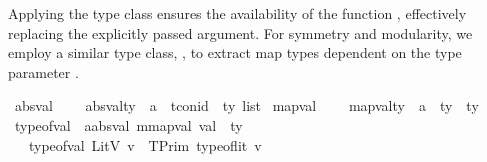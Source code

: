 Applying the type class  ensures the availability of the function ,
effectively replacing the explicitly passed argument.
For symmetry and modularity, we employ a similar type class, ,
to extract map types dependent on the type parameter .




\begin{isabellebody}\isanewline
{}\isamarkupfalse%
\ absval\ {\isacharequal}{\kern0pt}\isanewline
\ \ \ absval{\isacharunderscore}{\kern0pt}ty\ {\isacharcolon}{\kern0pt}{\isacharcolon}{\kern0pt}\ {\isachardoublequoteopen}{\isacharprime}{\kern0pt}a\ {\isasymRightarrow}\ {\isacharparenleft}{\kern0pt}tcon{\isacharunderscore}{\kern0pt}id\ {\isasymtimes}\ ty\ list{\isacharparenright}{\kern0pt}{\isachardoublequoteclose}\isanewline
\isanewline
{}\isamarkupfalse%
\ mapval\ {\isacharequal}{\kern0pt}\isanewline
\ \ \ mapval{\isacharunderscore}{\kern0pt}ty\ {\isacharcolon}{\kern0pt}{\isacharcolon}{\kern0pt}\ {\isachardoublequoteopen}{\isacharprime}{\kern0pt}a\ {\isasymRightarrow}\ {\isacharparenleft}{\kern0pt}ty\ {\isasymtimes}\ ty{\isacharparenright}{\kern0pt}{\isachardoublequoteclose}\isanewline
\isanewline
{}\isamarkupfalse%
\ type{\isacharunderscore}{\kern0pt}of{\isacharunderscore}{\kern0pt}val\ {\isacharcolon}{\kern0pt}{\isacharcolon}{\kern0pt}\ {\isachardoublequoteopen}{\isacharparenleft}{\kern0pt}{\isacharprime}{\kern0pt}a{\isacharcolon}{\kern0pt}{\isacharcolon}{\kern0pt}absval{\isacharcomma}{\kern0pt}\ {\isacharprime}{\kern0pt}m{\isacharcolon}{\kern0pt}{\isacharcolon}{\kern0pt}mapval{\isacharparenright}{\kern0pt}\ val\ {\isasymRightarrow}\ ty{\isachardoublequoteclose}\isanewline
\ \ \isanewline
\ \ \ {\isachardoublequoteopen}type{\isacharunderscore}{\kern0pt}of{\isacharunderscore}{\kern0pt}val\ {\isacharparenleft}{\kern0pt}LitV\ v{\isacharparenright}{\kern0pt}\ {\isacharequal}{\kern0pt}\ TPrim\ {\isacharparenleft}{\kern0pt}type{\isacharunderscore}{\kern0pt}of{\isacharunderscore}{\kern0pt}lit\ v{\isacharparenright}{\kern0pt}{\isachardoublequoteclose}\isanewline

\end{isabellebody}
